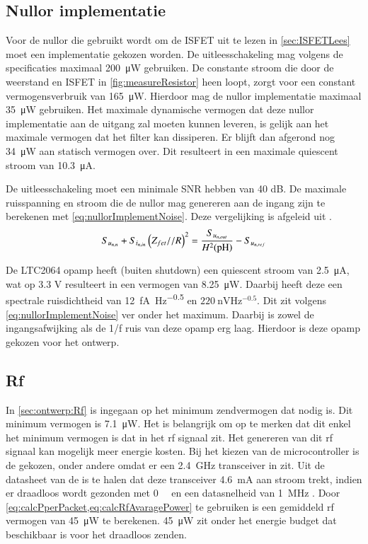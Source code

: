 \subsection{Nullor implementatie}
Voor de nullor die gebruikt wordt om de ISFET uit te lezen in \cref{sec:ISFETLees} moet een implementatie gekozen worden. De uitleesschakeling mag volgens de specificaties maximaal \qty{200}{\micro\watt}  gebruiken. De constante stroom die door de weerstand en ISFET in \cref{fig:measureResistor} heen loopt, zorgt voor een constant vermogensverbruik van \qty{165}{\micro\watt}. Hierdoor mag de nullor implementatie maximaal \qty{35}{\micro\watt} gebruiken. Het maximale dynamische vermogen dat deze nullor implementatie aan de uitgang zal moeten kunnen leveren, is gelijk aan het maximale vermogen dat het filter kan dissiperen. Er blijft dan afgerond nog \qty{34}{\micro\watt} aan statisch vermogen over. Dit resulteert in een maximale quiescent stroom van \qty{10.3}{\micro\ampere}.

De uitleesschakeling moet een minimale SNR hebben van 40 dB. De maximale ruisspanning en stroom die de nullor mag genereren aan de ingang zijn te berekenen met \cref{eq:nullorImplementNoise}. Deze vergelijking is afgeleid uit .
\begin{equation} \label{eq:nullorImplementNoise} 
    S_{u_{{n,n}}} + S_{i_{{n,in}}}\left(Z_{fet} // R\right)^2 = \frac{S_{u_{{n,out}}}}{H^2(\mathrm{pH})} - S_{u_{{n,ref}}}
\end{equation}

De LTC2064 opamp heeft (buiten shutdown) een quiescent stroom van \qty{2.5}{\micro\ampere}, wat op 3.3 V resulteert in een vermogen van \qty{8.25}{\micro\watt}. Daarbij heeft deze een spectrale ruisdichtheid van \qty{12}{\femto\ampere\hertz^{-0.5}} en $\qty{220}{\nano\volt\hertz^{-0.5}}$\cite{LTC2064}. Dit zit volgens \cref{eq:nullorImplementNoise} ver onder het maximum. Daarbij is zowel de ingangsafwijking als de 1/f ruis van deze opamp erg laag. Hierdoor is deze opamp gekozen voor het ontwerp.

\subsection{Rf}
In \cref{sec:ontwerp:Rf} is ingegaan op het minimum zendvermogen dat nodig is. Dit minimum vermogen is \qty{7.1}{\micro\watt}. Het is belangrijk om op te merken dat dit enkel het minimum vermogen is dat in het rf signaal zit. Het genereren van dit rf signaal kan mogelijk meer energie kosten. Bij het kiezen van de microcontroller is de \mcu gekozen, onder andere omdat er een \qty{2.4}{\giga\hertz} transceiver in zit. Uit de datasheet van de \mcu is te halen dat deze transceiver \qty{4.6}{\milli\ampere} aan stroom trekt, indien er draadloos wordt gezonden met \qty{0}{\deci\belmilliwatt} en een datasnelheid van \qty{1}{\mega\hertz} \cite{dsNrf52810}. Door \cref{eq:calcPperPacket,eq:calcRfAvaragePower} te gebruiken is een gemiddeld rf vermogen van \qty{45}{\micro\watt} te berekenen. \qty{45}{\micro\watt} zit onder het energie budget dat beschikbaar is voor het draadloos zenden.

